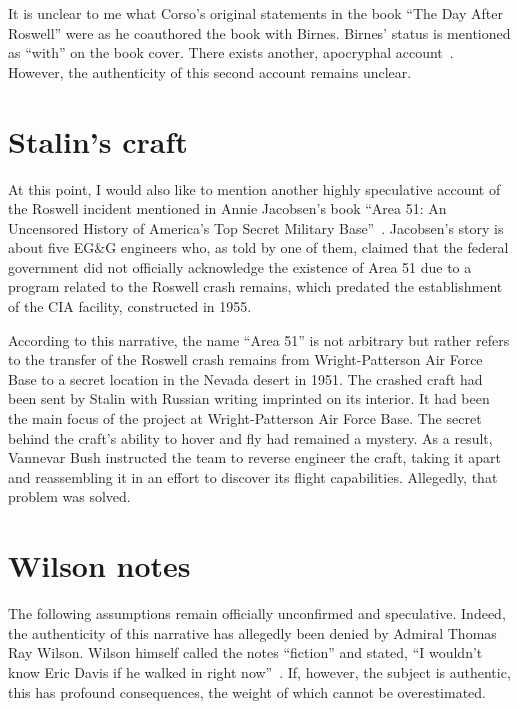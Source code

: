 It is unclear to me what Corso's original statements in the book ``The Day After Roswell'' were as he coauthored the book with Birnes. Birnes' status is mentioned as ``with'' on the book cover. There exists another, apocryphal account~\cite{Corso}. However, the authenticity of this second account remains unclear.

\section{Stalin's craft}

At this point, I would also like to mention another highly speculative account of the Roswell incident mentioned in Annie Jacobsen's book ``Area 51: An Uncensored History of America's Top Secret Military Base''~\cite{Jacobsen2011}. Jacobsen's story is about five EG{\&}G engineers who, as told by one of them, claimed that the federal government did not officially acknowledge the existence of Area 51 due to a program related to the Roswell crash remains, which predated the establishment of the CIA facility, constructed in 1955.

According to this narrative, the name ``Area 51'' is not arbitrary but rather refers to the transfer of the Roswell crash remains from Wright-Patterson Air Force Base to a secret location in the Nevada desert in 1951. The crashed craft had been sent by Stalin with Russian writing imprinted on its interior. It had been the main focus of the project at Wright-Patterson Air Force Base. The secret behind the craft's ability to hover and fly had remained a mystery. As a result, Vannevar Bush instructed the team to reverse engineer the craft, taking it apart and reassembling it in an effort to discover its flight capabilities. Allegedly, that problem was solved.

\section{Wilson notes}\label{2023-UFO-part-Perception-crash-retreivals-wn}


The following assumptions remain officially unconfirmed and speculative.
Indeed, the authenticity of this narrative has allegedly been denied by Admiral Thomas Ray Wilson.
Wilson himself called the notes ``fiction'' and stated, ``I wouldn't know Eric Davis if he walked in right now''~\cite{cox20,Cox2021Aug}.
If, however, the subject is authentic, this has profound consequences, the weight of which cannot be overestimated.


